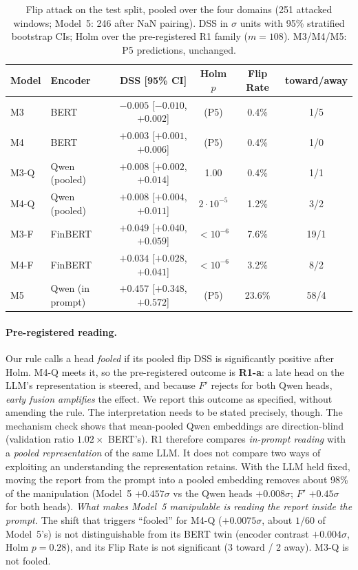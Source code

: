 \begin{table}[t]
\centering\small
\caption{Flip attack on the test split, pooled over the four domains (251 attacked windows;
Model~5: 246 after NaN pairing). DSS in $\sigma$ units with 95\% stratified bootstrap CIs;
Holm over the pre-registered R1 family ($m{=}108$). M3/M4/M5: P5 predictions, unchanged.}
\label{tab:r1-attack}
\begin{tabular}{llcccc}
\toprule
Model & Encoder & DSS [95\% CI] & Holm $p$ & Flip Rate & toward/away \\
\midrule
M3 & BERT & $-0.005$ [$-0.010$, $+0.002$] & (P5) & 0.4\% & 1/5 \\
M4 & BERT & $+0.003$ [$+0.001$, $+0.006$] & (P5) & 0.4\% & 1/0 \\
M3-Q & Qwen (pooled) & $+0.008$ [$+0.002$, $+0.014$] & 1.00 & 0.4\% & 1/1 \\
M4-Q & Qwen (pooled) & $+0.008$ [$+0.004$, $+0.011$] & $2\cdot10^{-5}$ & 1.2\% & 3/2 \\
M3-F & FinBERT & $+0.049$ [$+0.040$, $+0.059$] & $<10^{-6}$ & 7.6\% & 19/1 \\
M4-F & FinBERT & $+0.034$ [$+0.028$, $+0.041$] & $<10^{-6}$ & 3.2\% & 8/2 \\
\midrule
M5 & Qwen (in prompt) & $+0.457$ [$+0.348$, $+0.572$] & (P5) & 23.6\% & 58/4 \\
\bottomrule
\end{tabular}
\end{table}

\paragraph{Pre-registered reading.}
Our rule calls a head \emph{fooled} if its pooled flip DSS is significantly positive after
Holm. M4-Q meets it, so the pre-registered outcome is \textbf{R1-a}: a late head on the LLM's
representation is steered, and because $F'$ rejects for both Qwen heads, \emph{early fusion
amplifies} the effect. We report this outcome as specified, without amending the rule. The
interpretation needs to be stated precisely, though. The mechanism check shows that mean-pooled
Qwen embeddings are direction-blind (validation ratio $1.02\times$ BERT's). R1 therefore compares
\emph{in-prompt reading} with a \emph{pooled representation} of the same LLM. It does not compare
two ways of exploiting an understanding the representation retains. With the LLM held fixed,
moving the report from the prompt into a pooled embedding removes about 98\% of the manipulation
(Model~5 $+0.457\sigma$ vs the Qwen heads $+0.008\sigma$; $F'$ $+0.45\sigma$ for both heads).
\emph{What makes Model~5 manipulable is reading the report inside the prompt.} The shift that
triggers ``fooled'' for M4-Q ($+0.0075\sigma$, about $1/60$ of Model~5's) is not distinguishable
from its BERT twin (encoder contrast $+0.004\sigma$, Holm $p=0.28$), and its Flip Rate is not
significant (3 toward / 2 away). M3-Q is not fooled.

